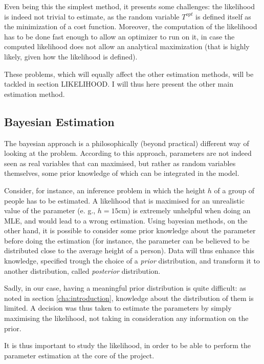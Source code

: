 Even being this the simplest method, it presents some challenges:
the likelihood is indeed not trivial to estimate,
as the random variable \(T^{opt}\) is defined itself as the minimization of a cost function.
Moreover, the computation of the likelihood has to be done fast enough to allow an optimizer to run on it,
in case the computed likelihood does not allow an analytical maximization (that is highly likely,
given how the likelihood is defined).

These problems, which will equally affect the other estimation methods,
will be tackled in section LIKELIHOOD.
I will thus here present the other main estimation method.

\subsection{Bayesian Estimation}
\label{sec:bayes}

The bayesian approach is a philosophically (beyond practical) different way of looking at the problem.
According to this approach, parameters are not indeed seen as real variables that can maximised,
but rather as random variables themselves,
some prior knowledge of which can be integrated in the model.

Consider, for instance, an inference problem in which
the height \(h\) of a group of people has to be estimated.
A likelihood that is maximised for an unrealistic value of the parameter (e. g., \(h = 15 \unit{\cm}\)) is extremely unhelpful when doing an MLE,
and would lead to a wrong estimation.
Using bayesian methods, on the other hand,
it is possible to consider some prior knowledge about the parameter before doing the estimation
(for instance, the parameter can be believed to be distributed close to the average height of a person).
Data will thus enhance this knowledge,
specified trough the choice of a \textit{prior} distribution,
and transform it to another distribution, called \textit{posterior} distribution.

Sadly, in our case, having a meaningful prior distribution is quite difficult:
as noted in section \ref{cha:introduction},
knowledge about the distribution of them is limited.
A decision was thus taken to estimate the parameters by simply maximising the likelihood,
not taking in consideration any information on the prior.

It is thus important to study the likelihood,
in order to be able to perform the parameter estimation at the core of the project.

